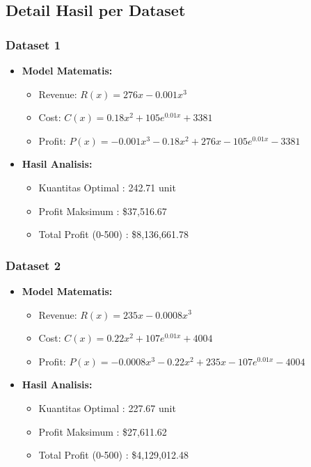 \documentclass[conference]{IEEEtran}
\begin{document}
\vspace{1cm}
\subsection{Detail Hasil per Dataset}

\subsubsection{Dataset 1}
\begin{itemize}
    \item \textbf{Model Matematis:}
    \begin{itemize}
        \item Revenue: \( R(x) = 276x - 0.001x^3 \)
        \item Cost: \( C(x) = 0.18x^2 + 105e^{0.01x} + 3381 \)
        \item Profit: \( P(x) = -0.001x^3 - 0.18x^2 + 276x - 105e^{0.01x} - 3381 \)
    \end{itemize}
    \item \textbf{Hasil Analisis:}
    \begin{itemize}
        \item Kuantitas Optimal : 242.71 unit
        \item Profit Maksimum  : \$37,516.67
        \item Total Profit (0-500) : \$8,136,661.78
    \end{itemize}
\end{itemize}

\subsubsection{Dataset 2}
\begin{itemize}
    \item \textbf{Model Matematis:}
    \begin{itemize}
        \item Revenue: \( R(x) = 235x - 0.0008x^3 \)
        \item Cost: \( C(x) = 0.22x^2 + 107e^{0.01x} + 4004 \)
        \item Profit: \( P(x) = -0.0008x^3 - 0.22x^2 + 235x - 107e^{0.01x} - 4004 \)
    \end{itemize}
    \item \textbf{Hasil Analisis:}
    \begin{itemize}
        \item Kuantitas Optimal : 227.67 unit
        \item Profit Maksimum  : \$27,611.62
        \item Total Profit (0-500) : \$4,129,012.48
    \end{itemize}
\end{itemize}
\end{document}
